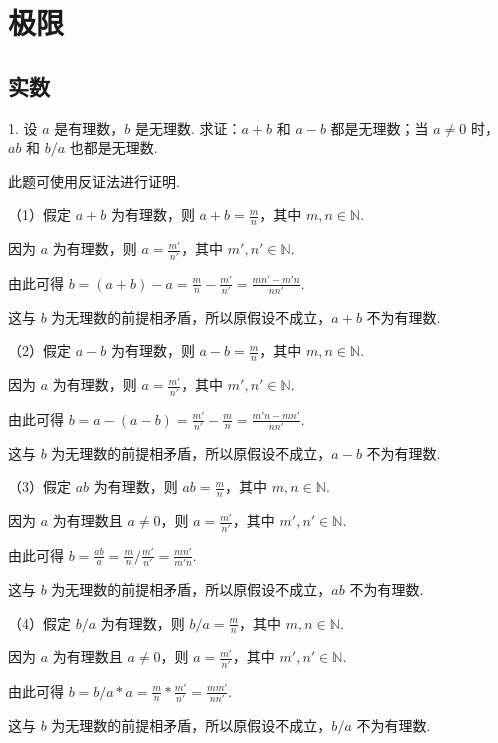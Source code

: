 \documentclass[12pt, a4paper, oneside, UTF8]{ctexbook}
\begin{document}

\fi

\chapter{极限}

\section{实数}

1. 设 $a$ 是有理数，$b$ 是无理数. 求证：$a + b$ 和 $a - b$ 都是无理数；当 $a \neq 0$ 时，$ab$ 和 $b/a$ 也都是无理数.

\begin{solution}
此题可使用反证法进行证明.

（1）假定 $a + b$ 为有理数，则 $\displaystyle a + b = \frac{m}{n}$，其中 $m, n \in \mathbb{N}$.

因为 $a$ 为有理数，则 $\displaystyle a = \frac{m'}{n'}$，其中 $m', n' \in \mathbb{N}$.

由此可得 $\displaystyle b = (a + b) - a = \frac{m}{n} - \frac{m'}{n'} = \frac{mn' - m'n}{nn'}$.

这与 $b$ 为无理数的前提相矛盾，所以原假设不成立，$a + b$ 不为有理数.

\vspace{1.5em}

（2）假定 $a - b$ 为有理数，则 $\displaystyle a - b = \frac{m}{n}$，其中 $m, n \in \mathbb{N}$.

因为 $a$ 为有理数，则 $\displaystyle a = \frac{m'}{n'}$，其中 $m', n' \in \mathbb{N}$.

由此可得 $\displaystyle b = a - (a - b) = \frac{m'}{n'} - \frac{m}{n} = \frac{m'n - mn'}{nn'}$.

这与 $b$ 为无理数的前提相矛盾，所以原假设不成立，$a - b$ 不为有理数.

\vspace{1.5em}

（3）假定 $ab$ 为有理数，则 $\displaystyle ab = \frac{m}{n}$，其中 $m, n \in \mathbb{N}$.

因为 $a$ 为有理数且 $a \neq 0$，则 $\displaystyle a = \frac{m'}{n'}$，其中 $m', n' \in \mathbb{N}$.

由此可得 $\displaystyle b = \frac{ab}{a} = \frac{m}{n}/\frac{m'}{n'} = \frac{mn'}{m'n}$.

这与 $b$ 为无理数的前提相矛盾，所以原假设不成立，$ab$ 不为有理数.

\vspace{1.5em}

（4）假定 $b/a$ 为有理数，则 $\displaystyle b/a = \frac{m}{n}$，其中 $m, n \in \mathbb{N}$.

因为 $a$ 为有理数且 $a \neq 0$，则 $\displaystyle a = \frac{m'}{n'}$，其中 $m', n' \in \mathbb{N}$.

由此可得 $\displaystyle b = b/a * a = \frac{m}{n}*\frac{m'}{n'} = \frac{mm'}{nn'}$.

这与 $b$ 为无理数的前提相矛盾，所以原假设不成立，$b/a$ 不为有理数.
\end{solution}
\end{document}
